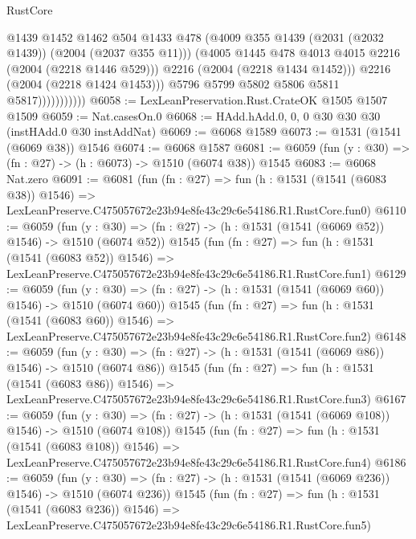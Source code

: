 \begin{lexlean}{RustCore}
\begin{coremodule}
                              @1439
                              @1452
                              @1462
                              @504
                              @1433
                              @478
                              (@4009 @355 @1439 (@2031 (@2032 @1439)) (@2004 (@2037 @355 @11)))
                              (@4005 @1445 @478 @4013 @4015 @2216 (@2004 (@2218 @1446 @529)))
                              @2216
                              (@2004 (@2218 @1434 @1452)))
                            @2216
                            (@2004 (@2218 @1424 @1453)))
                          @5796
                          @5799
                          @5802
                          @5806
                          @5811
                          @5817)))))))))))
@6058 := LexLeanPreservation.Rust.CrateOK @1505 @1507 @1509
@6059 := Nat.casesOn.{0}
@6068 := HAdd.hAdd.{0, 0, 0} @30 @30 @30 (instHAdd.{0} @30 instAddNat)
@6069 := @6068 @1589
@6073 := @1531 (@1541 (@6069 @38)) @1546
@6074 := @6068 @1587
@6081 := @6059 (fun (y : @30) => (fn : @27) -> (h : @6073) -> @1510 (@6074 @38)) @1545
@6083 := @6068 Nat.zero
@6091 := @6081
    (fun (fn : @27) =>
    fun (h : @1531 (@1541 (@6083 @38)) @1546) =>
    LexLeanPreserve.C475057672e23b94e8fe43c29c6e54186.R1.RustCore.fun0)
@6110 := @6059
    (fun (y : @30) => (fn : @27) -> (h : @1531 (@1541 (@6069 @52)) @1546) -> @1510 (@6074 @52))
    @1545
    (fun (fn : @27) =>
    fun (h : @1531 (@1541 (@6083 @52)) @1546) =>
    LexLeanPreserve.C475057672e23b94e8fe43c29c6e54186.R1.RustCore.fun1)
@6129 := @6059
    (fun (y : @30) => (fn : @27) -> (h : @1531 (@1541 (@6069 @60)) @1546) -> @1510 (@6074 @60))
    @1545
    (fun (fn : @27) =>
    fun (h : @1531 (@1541 (@6083 @60)) @1546) =>
    LexLeanPreserve.C475057672e23b94e8fe43c29c6e54186.R1.RustCore.fun2)
@6148 := @6059
    (fun (y : @30) => (fn : @27) -> (h : @1531 (@1541 (@6069 @86)) @1546) -> @1510 (@6074 @86))
    @1545
    (fun (fn : @27) =>
    fun (h : @1531 (@1541 (@6083 @86)) @1546) =>
    LexLeanPreserve.C475057672e23b94e8fe43c29c6e54186.R1.RustCore.fun3)
@6167 := @6059
    (fun (y : @30) => (fn : @27) -> (h : @1531 (@1541 (@6069 @108)) @1546) -> @1510 (@6074 @108))
    @1545
    (fun (fn : @27) =>
    fun (h : @1531 (@1541 (@6083 @108)) @1546) =>
    LexLeanPreserve.C475057672e23b94e8fe43c29c6e54186.R1.RustCore.fun4)
@6186 := @6059
    (fun (y : @30) => (fn : @27) -> (h : @1531 (@1541 (@6069 @236)) @1546) -> @1510 (@6074 @236))
    @1545
    (fun (fn : @27) =>
    fun (h : @1531 (@1541 (@6083 @236)) @1546) =>
    LexLeanPreserve.C475057672e23b94e8fe43c29c6e54186.R1.RustCore.fun5)

\end{coremodule}
\end{lexlean}
